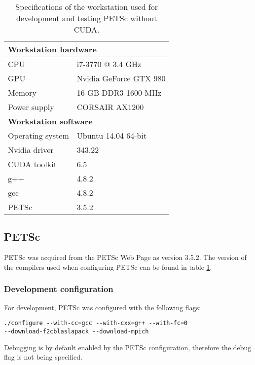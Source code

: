 \begin{table}[h]
	\begin{center}
	\bgroup
	\def\arraystretch{1.2}
	\begin{tabular}{|l|l|}
		\hline
		\multicolumn{2}{|l|}{\textbf{Workstation hardware}} \\ \hline
		CPU & i7-3770 @ 3.4 GHz \\ \hline
		GPU & Nvidia GeForce GTX 980 \\ \hline
		Memory & 16 GB DDR3 1600 MHz \\ \hline
		Power supply & CORSAIR AX1200 \\ \hline
		\multicolumn{2}{|l|}{\textbf{Workstation software}} \\ \hline
		Operating system & Ubuntu 14.04 64-bit \\ \hline
		Nvidia driver & 343.22 \\ \hline
		CUDA toolkit & 6.5 \\ \hline
		g++ & 4.8.2 \\ \hline
		gcc & 4.8.2 \\ \hline
		PETSc & 3.5.2 \\ \hline
	\end{tabular}
	\egroup
	\end{center}
	\caption{Specifications of the workstation used for development and testing PETSc without CUDA.}
	\label{table:dev_pc}
\end{table}

\subsection{PETSc}

PETSc was acquired from the PETSc Web Page\cite{petsc-web-page} as version 3.5.2. 
The version of the compilers used when configuring PETSc can be found in table 
\ref{table:dev_pc}.

\subsubsection{Development configuration}

For development, PETSc was configured with the following flags:
\lstset{language=bash}
\begin{lstlisting}
./configure --with-cc=gcc --with-cxx=g++ --with-fc=0 
--download-f2cblaslapack --download-mpich
\end{lstlisting}
Debugging is by default enabled by the PETSc configuration, therefore the debug 
flag is not being specified.


